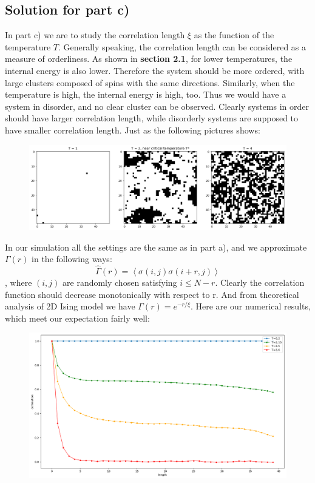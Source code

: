 \documentclass[a4paper]{article}
\begin{document}
\subsection{Solution for part c)}
In part c) we are to study the correlation length $\xi$ as the function of the temperature $T$. Generally speaking, the correlation length can be considered as a measure of orderliness. As shown in \textbf{section 2.1}, for lower temperatures, the internal energy is also lower. Therefore the system should be more ordered, with large clusters composed of spins with the same directions. Similarly, when the temperature is high, the internal energy is high, too. Thus we would have a system in disorder, and no clear cluster can be observed. Clearly systems in order should have larger correlation length, while disorderly systems are supposed to have smaller correlation length. Just as the following pictures shows:
\begin{figure}[H]
\centering
\includegraphics[scale=0.325]{config_visualization.png}
\end{figure}

In our simulation all the settings are the same as in part a), and we approximate $\Gamma(r)$ in the following ways:
\begin{displaymath}
\hat\Gamma(r) = \left<\sigma(i,j)\sigma(i+r,j) \right>
\end{displaymath}
, where $(i,j)$ are randomly chosen satisfying $i \leq N-r$. Clearly the correlation function should decrease monotonically with respect to r. And from theoretical analysis of 2D Ising model we have $\Gamma(r)=e^{-r/\xi}$. Here are our numerical results, which meet our expectation fairly well:
\begin{figure}[H]
\centering
\includegraphics[scale=0.325]{cor.png}
\end{figure}
\end{document}
